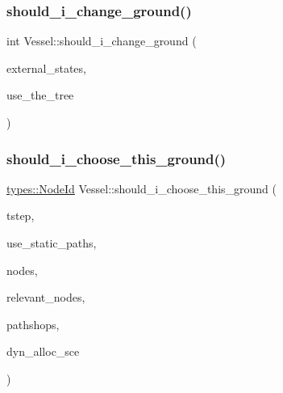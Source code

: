 \mbox{\label{class_vessel_a713b45c6df81e3a355ca1dfc7c48a65d}} 
\subsubsection{\texorpdfstring{should\_i\_change\_ground()}{should\_i\_change\_ground()}}
{\footnotesize\ttfamily int Vessel\+::should\+\_\+i\+\_\+change\+\_\+ground (\begin{DoxyParamCaption}\item[{std\+::map$<$ std\+::string, int $>$ \&}]{external\+\_\+states,  }\item[{bool}]{use\+\_\+the\+\_\+tree }\end{DoxyParamCaption})}

\mbox{\label{class_vessel_a62002449aeeeb51233c6797aacbbcc83}} 
\subsubsection{\texorpdfstring{should\_i\_choose\_this\_ground()}{should\_i\_choose\_this\_ground()}}
{\footnotesize\ttfamily \mbox{\hyperlink{classtypes_1_1_node_id}{types\+::\+Node\+Id}} Vessel\+::should\+\_\+i\+\_\+choose\+\_\+this\+\_\+ground (\begin{DoxyParamCaption}\item[{int}]{tstep,  }\item[{int}]{use\+\_\+static\+\_\+paths,  }\item[{std\+::vector$<$ \mbox{\hyperlink{class_node}{Node}} $\ast$ $>$ \&}]{nodes,  }\item[{const std\+::vector$<$ \mbox{\hyperlink{classtypes_1_1_node_id}{types\+::\+Node\+Id}} $>$ \&}]{relevant\+\_\+nodes,  }\item[{const std\+::vector$<$ \mbox{\hyperlink{class_path_shop}{Path\+Shop}} $>$ \&}]{pathshops,  }\item[{const \mbox{\hyperlink{class_dyn_alloc_options}{Dyn\+Alloc\+Options}} \&}]{dyn\+\_\+alloc\+\_\+sce }\end{DoxyParamCaption})}

\mbox{\label{class_vessel_aae6fae8e1dd56f25bcdb4711d08b2e9b}} 
